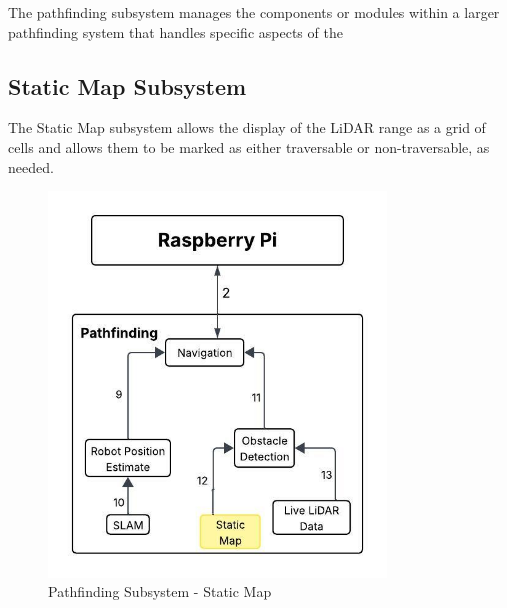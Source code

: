 
The pathfinding subsystem manages the components or modules within a larger pathfinding system that handles specific aspects of the 

\subsection{Static Map Subsystem}
The Static Map subsystem allows the display of the LiDAR range as a grid of cells and allows them to be marked as either traversable or non-traversable, as needed.



\begin{figure}[h!]
	\centering
 	\includegraphics[width=0.80\textwidth]{images/pathfinding 2/Data_Flow_StaticMap.jpeg}
 \caption{Pathfinding Subsystem - Static Map} %
\end{figure}

